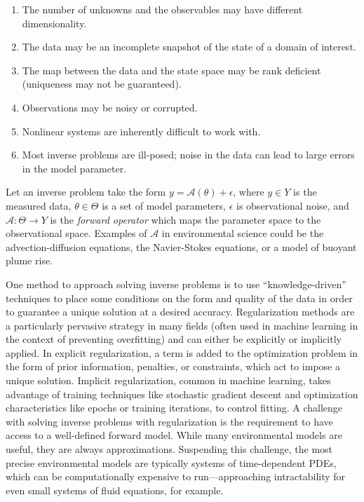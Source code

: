 \begin{enumerate}
	\item The number of unknowns and the observables may have different dimensionality.
	\item The data may be an incomplete snapshot of the state of a domain of interest.
	\item The map between the data and the state space may be rank deficient (uniqueness may not be guaranteed).
	\item Observations may be noisy or corrupted.
	\item Nonlinear systems are inherently difficult to work with.
	\item Most inverse problems are ill-posed; noise in the data can lead to large errors in the model parameter.
\end{enumerate}

Let an inverse problem take the form $y = \mathcal{A}(\theta) + \epsilon$, where $y \in Y$ is the measured data, $\theta \in \Theta$ is a set of model parameters, $\epsilon$ is observational noise, and $\mathcal{A} : \Theta \longrightarrow Y$ is the \emph{forward operator} which maps the parameter space to the observational space. Examples of $\mathcal{A}$ in environmental science could be the advection-diffusion equations, the Navier-Stokes equations\autocite{euler1757principes,182navier2lois,stokes1851effect}, or a model of buoyant plume rise\autocite{speer1989model,lavelle2013turbulent}.

One method to approach solving inverse problems is to use ``knowledge-driven'' techniques to place some conditions on the form and quality of the data in order to guarantee a unique solution at a desired accuracy. Regularization methods are a particularly pervasive strategy in many fields (often used in machine learning in the context of preventing overfitting\autocite{srivastava2014dropout}) and can either be explicitly or implicitly applied. In explicit regularization, a term is added to the optimization problem in the form of prior information, penalties, or constraints, which act to impose a unique solution\autocite{engl1996regularization,benning2018modern,iglesias2013ensemble}. Implicit regularization, common in machine learning, takes advantage of training techniques like stochastic gradient descent\autocite{bottou2010large,amari1993backpropagation} and optimization characteristics like epochs or training iterations, to control fitting. A challenge with solving inverse problems with regularization is the requirement to have access to a well-defined forward model. While many environmental models are useful, they are always approximations. Suspending this challenge, the most precise environmental models are typically systems of time-dependent PDEs, which can be computationally expensive to run---approaching intractability for even small systems of fluid equations, for example.

